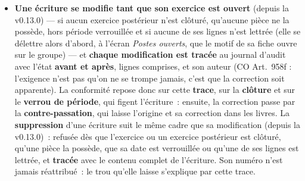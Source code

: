 \documentclass[a4paper,11pt,oneside]{article}
\begin{document}
\begin{itemize}
    \item \textbf{Une écriture se modifie tant que son exercice est ouvert} (depuis la v0.13.0) --- si aucun exercice postérieur n'est clôturé, qu'aucune pièce ne la possède, hors période verrouillée et si aucune de ses lignes n'est lettrée (elle se délettre alors d'abord, à l'écran \emph{Postes ouverts}, que le motif de sa fiche ouvre sur le groupe) --- et \textbf{chaque modification est tracée} au journal d'audit avec l'état \textbf{avant et après}, lignes comprises, et son auteur (CO Art.~958f : l'exigence n'est pas qu'on ne se trompe jamais, c'est que la correction soit apparente). La conformité repose donc sur cette \textbf{trace}, sur la \textbf{clôture} et sur le \textbf{verrou de période}, qui figent l'écriture~: ensuite, la correction passe par la \textbf{contre-passation}, qui laisse l'origine et sa correction dans les livres. La \textbf{suppression} d'une écriture suit le même cadre que sa modification (depuis la v0.13.0)~: refusée dès que l'exercice ou un exercice postérieur est clôturé, qu'une pièce la possède, que sa date est verrouillée ou qu'une de ses lignes est lettrée, et \textbf{tracée} avec le contenu complet de l'écriture. Son numéro n'est jamais réattribué~: le trou qu'elle laisse s'explique par cette trace.


\end{itemize}
\end{document}
